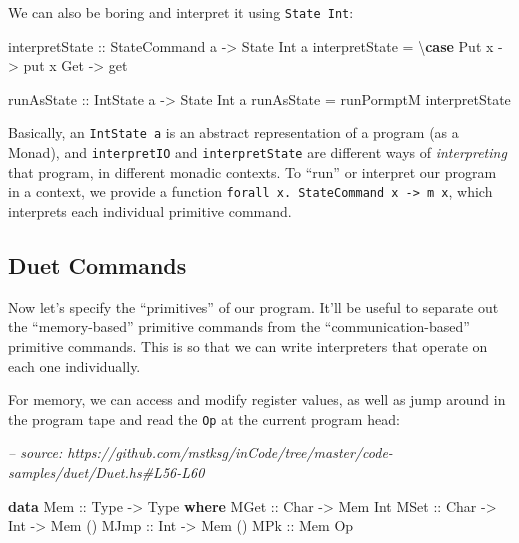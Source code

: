 \documentclass[]{article}
\newenvironment{Shaded}{}{}
\newcommand{\CommentTok}[1]{\textcolor[rgb]{0.38,0.63,0.69}{\textit{#1}}}
\newcommand{\DataTypeTok}[1]{\textcolor[rgb]{0.56,0.13,0.00}{#1}}
\newcommand{\FunctionTok}[1]{\textcolor[rgb]{0.02,0.16,0.49}{#1}}
\newcommand{\KeywordTok}[1]{\textcolor[rgb]{0.00,0.44,0.13}{\textbf{#1}}}
\newcommand{\NormalTok}[1]{#1}
\newcommand{\OtherTok}[1]{\textcolor[rgb]{0.00,0.44,0.13}{#1}}
\begin{document}
We can also be boring and interpret it using \texttt{State\ Int}:

\begin{Shaded}
\begin{Highlighting}[]
\OtherTok{interpretState ::} \DataTypeTok{StateCommand}\NormalTok{ a }\OtherTok{->} \DataTypeTok{State} \DataTypeTok{Int}\NormalTok{ a}
\NormalTok{interpretState }\FunctionTok{=}\NormalTok{ \textbackslash{}}\KeywordTok{case}
    \DataTypeTok{Put}\NormalTok{ x }\OtherTok{->}\NormalTok{ put x}
    \DataTypeTok{Get}   \OtherTok{->}\NormalTok{ get}

\OtherTok{runAsState ::} \DataTypeTok{IntState}\NormalTok{ a }\OtherTok{->} \DataTypeTok{State} \DataTypeTok{Int}\NormalTok{ a}
\NormalTok{runAsState }\FunctionTok{=}\NormalTok{ runPormptM interpretState}
\end{Highlighting}
\end{Shaded}

Basically, an \texttt{IntState\ a} is an abstract representation of a program
(as a Monad), and \texttt{interpretIO} and \texttt{interpretState} are different
ways of \emph{interpreting} that program, in different monadic contexts. To
``run'' or interpret our program in a context, we provide a function
\texttt{forall\ x.\ StateCommand\ x\ -\textgreater{}\ m\ x}, which interprets
each individual primitive command.

\hypertarget{duet-commands}{%
\subsection{Duet Commands}\label{duet-commands}}

Now let's specify the ``primitives'' of our program. It'll be useful to separate
out the ``memory-based'' primitive commands from the ``communication-based''
primitive commands. This is so that we can write interpreters that operate on
each one individually.

For memory, we can access and modify register values, as well as jump around in
the program tape and read the \texttt{Op} at the current program head:

\begin{Shaded}
\begin{Highlighting}[]
\CommentTok{-- source: https://github.com/mstksg/inCode/tree/master/code-samples/duet/Duet.hs#L56-L60}

\KeywordTok{data} \DataTypeTok{Mem}\OtherTok{ ::} \DataTypeTok{Type} \OtherTok{->} \DataTypeTok{Type} \KeywordTok{where}
    \DataTypeTok{MGet}\OtherTok{ ::} \DataTypeTok{Char} \OtherTok{->} \DataTypeTok{Mem} \DataTypeTok{Int}
    \DataTypeTok{MSet}\OtherTok{ ::} \DataTypeTok{Char} \OtherTok{->} \DataTypeTok{Int} \OtherTok{->} \DataTypeTok{Mem}\NormalTok{ ()}
    \DataTypeTok{MJmp}\OtherTok{ ::} \DataTypeTok{Int}  \OtherTok{->} \DataTypeTok{Mem}\NormalTok{ ()}
    \DataTypeTok{MPk}\OtherTok{  ::} \DataTypeTok{Mem} \DataTypeTok{Op}
\end{Highlighting}
\end{Shaded}
\end{document}
